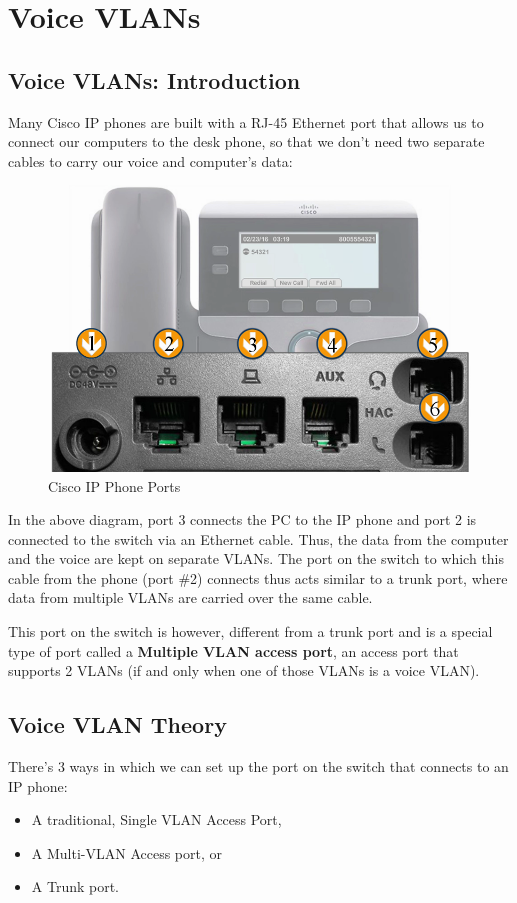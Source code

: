 \chapter{Voice VLANs}
\section{Voice VLANs: Introduction}
Many Cisco IP phones are built with a RJ-45 Ethernet port that allows us to connect our computers to the desk phone, so that we don't need two separate cables to carry our voice and computer's data:

\begin{figure}[H]
\centering
\includegraphics[width=0.7\linewidth]{"ICND1/1. Switches/chapters/6.1.a IP phone"}
\caption{Cisco IP Phone Ports}
\label{fig:6.1.a}
\end{figure}
\vspace{-10pt}

\noindent
In the above diagram, port 3 connects the PC to the IP phone and port 2 is connected to the switch via an Ethernet cable. Thus, the data from the computer and the voice are kept on separate VLANs. The port on the switch to which this cable from the phone (port \#2) connects thus acts similar to a trunk port, where data from multiple VLANs are carried over the same cable. 

This port on the switch is however, different from a trunk port and is a special type of port called a \textbf{Multiple VLAN access port}, an access port that supports 2 VLANs (if and only when one of those VLANs is a voice VLAN). 

\section{Voice VLAN Theory}
There's 3 ways in which we can set up the port on the switch that connects to an IP phone: 
\vspace{-10pt}
\begin{itemize}
\item A traditional, Single VLAN Access Port, 
\item A Multi-VLAN Access port, or 
\item A Trunk port. 
\end{itemize}

